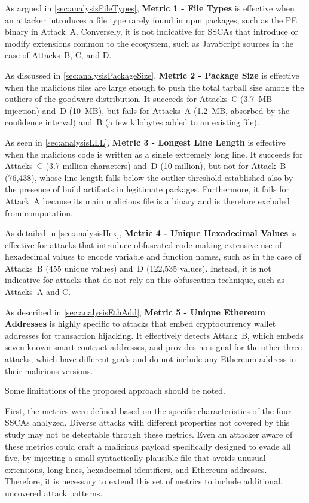 As argued in \cref{sec:analysisFileTypes},
\textbf{Metric 1 - File Types} is effective when an attacker introduces a file type rarely found in \ac{npm} packages,
such as the \ac{PE} binary in Attack~A.
Conversely, it is not indicative for \acp{SSCA} that introduce or modify extensions common to the ecosystem, 
such as JavaScript sources in the case of Attacks~B, C, and D.

As discussed in \cref{sec:analysisPackageSize},
\textbf{Metric 2 - Package Size} is effective when the malicious files are large enough
to push the total tarball size among the outliers of the goodware distribution.
It succeeds for Attacks~C (3.7~MB injection) and~D (10~MB),
but fails for Attacks~A (1.2~MB, absorbed by the confidence interval)
and~B (a few kilobytes added to an existing file).

As seen in \cref{sec:analysisLLL},
\textbf{Metric 3 - Longest Line Length} is effective when the malicious code is written as a single extremely long line.
It succeeds for Attacks~C (3.7 million characters) and~D (10 million),
but not for Attack~B (76,438), 
whose line length falls below the outlier threshold established also by the presence of build artifacts in legitimate packages.
Furthermore, it fails for Attack~A because its main malicious file is a binary and is therefore excluded from computation.

As detailed in \cref{sec:analysisHex},
\textbf{Metric 4 - Unique Hexadecimal Values} is effective for attacks that introduce obfuscated code making extensive use of 
hexadecimal values to encode variable and function names, such as in the case of Attacks~B (455 unique values) and~D (122,535 values).
Instead, it is not indicative for attacks that do not rely on this obfuscation technique, such as Attacks~A and C.

As described in \cref{sec:analysisEthAdd},
\textbf{Metric 5 - Unique Ethereum Addresses} is highly specific to attacks that embed cryptocurrency wallet addresses for transaction hijacking.
It effectively detects Attack~B, which embeds seven known smart contract addresses, 
and provides no signal for the other three attacks, which have different goals and do not include any Ethereum address in their malicious versions.

Some limitations of the proposed approach should be noted.

First, the metrics were defined based on the specific characteristics of the four \acp{SSCA} analyzed. 
Diverse attacks with different properties not covered by this study may not be detectable through these metrics.
Even an attacker aware of these metrics could craft a malicious payload specifically designed to evade all five, 
by injecting a small syntactically plausible file that avoids unusual extensions, long lines, hexadecimal identifiers, and Ethereum addresses.
Therefore, it is necessary to extend this set of metrics to include additional, uncovered attack patterns.

